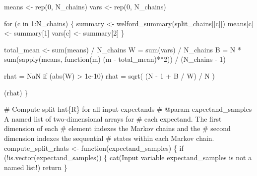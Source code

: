 \documentclass[
  letterpaper,
  DIV=11,
  numbers=noendperiod]{scrartcl}
\newenvironment{Shaded}{\begin{snugshade}}{\end{snugshade}}
\newcommand{\CommentTok}[1]{\textcolor[rgb]{0.37,0.37,0.37}{#1}}
\newcommand{\ConstantTok}[1]{\textcolor[rgb]{0.56,0.35,0.01}{#1}}
\newcommand{\ControlFlowTok}[1]{\textcolor[rgb]{0.00,0.23,0.31}{#1}}
\newcommand{\DecValTok}[1]{\textcolor[rgb]{0.68,0.00,0.00}{#1}}
\newcommand{\FloatTok}[1]{\textcolor[rgb]{0.68,0.00,0.00}{#1}}
\newcommand{\FunctionTok}[1]{\textcolor[rgb]{0.28,0.35,0.67}{#1}}
\newcommand{\NormalTok}[1]{\textcolor[rgb]{0.00,0.23,0.31}{#1}}
\newcommand{\OtherTok}[1]{\textcolor[rgb]{0.00,0.23,0.31}{#1}}
\newcommand{\SpecialCharTok}[1]{\textcolor[rgb]{0.37,0.37,0.37}{#1}}
\newcommand{\StringTok}[1]{\textcolor[rgb]{0.13,0.47,0.30}{#1}}
\begin{document}
\begin{Shaded}
\begin{Highlighting}[]
\NormalTok{  means }\OtherTok{\textless{}{-}} \FunctionTok{rep}\NormalTok{(}\DecValTok{0}\NormalTok{, N\_chains)}
\NormalTok{  vars }\OtherTok{\textless{}{-}} \FunctionTok{rep}\NormalTok{(}\DecValTok{0}\NormalTok{, N\_chains)}

  \ControlFlowTok{for}\NormalTok{ (c }\ControlFlowTok{in} \DecValTok{1}\SpecialCharTok{:}\NormalTok{N\_chains) \{}
\NormalTok{    summary }\OtherTok{\textless{}{-}} \FunctionTok{welford\_summary}\NormalTok{(split\_chains[[c]])}
\NormalTok{    means[c] }\OtherTok{\textless{}{-}}\NormalTok{ summary[}\DecValTok{1}\NormalTok{]}
\NormalTok{    vars[c] }\OtherTok{\textless{}{-}}\NormalTok{ summary[}\DecValTok{2}\NormalTok{]}
\NormalTok{  \}}

\NormalTok{  total\_mean }\OtherTok{\textless{}{-}} \FunctionTok{sum}\NormalTok{(means) }\SpecialCharTok{/}\NormalTok{ N\_chains}
\NormalTok{  W }\OtherTok{=} \FunctionTok{sum}\NormalTok{(vars) }\SpecialCharTok{/}\NormalTok{ N\_chains}
\NormalTok{  B }\OtherTok{=}\NormalTok{ N }\SpecialCharTok{*} \FunctionTok{sum}\NormalTok{(}\FunctionTok{sapply}\NormalTok{(means, }\ControlFlowTok{function}\NormalTok{(m)}
\NormalTok{                            (m }\SpecialCharTok{{-}}\NormalTok{ total\_mean)}\SpecialCharTok{**}\DecValTok{2}\NormalTok{)) }\SpecialCharTok{/}\NormalTok{ (N\_chains }\SpecialCharTok{{-}} \DecValTok{1}\NormalTok{)}

\NormalTok{  rhat }\OtherTok{=} \ConstantTok{NaN}
  \ControlFlowTok{if}\NormalTok{ (}\FunctionTok{abs}\NormalTok{(W) }\SpecialCharTok{\textgreater{}} \FloatTok{1e{-}10}\NormalTok{)}
\NormalTok{    rhat }\OtherTok{=} \FunctionTok{sqrt}\NormalTok{( (N }\SpecialCharTok{{-}} \DecValTok{1} \SpecialCharTok{+}\NormalTok{ B }\SpecialCharTok{/}\NormalTok{ W) }\SpecialCharTok{/}\NormalTok{ N )}

\NormalTok{  (rhat)}
\NormalTok{\}}

\CommentTok{\# Compute split hat\{R\} for all input expectands}
\CommentTok{\# @param expectand\_samples A named list of two{-}dimensional arrays for }
\CommentTok{\#                          each expectand.  The first dimension of each}
\CommentTok{\#                          element indexes the Markov chains and the }
\CommentTok{\#                          second dimension indexes the sequential }
\CommentTok{\#                          states within each Markov chain.}
\NormalTok{compute\_split\_rhats }\OtherTok{\textless{}{-}} \ControlFlowTok{function}\NormalTok{(expectand\_samples) \{}
  \ControlFlowTok{if}\NormalTok{ (}\SpecialCharTok{!}\FunctionTok{is.vector}\NormalTok{(expectand\_samples)) \{}
    \FunctionTok{cat}\NormalTok{(}\StringTok{\textquotesingle{}Input variable \textasciigrave{}expectand\_samples\textasciigrave{} is not a named list!\textquotesingle{}}\NormalTok{)}
\NormalTok{    return}
\NormalTok{  \}}


\end{Highlighting}
\end{Shaded}
\end{document}

